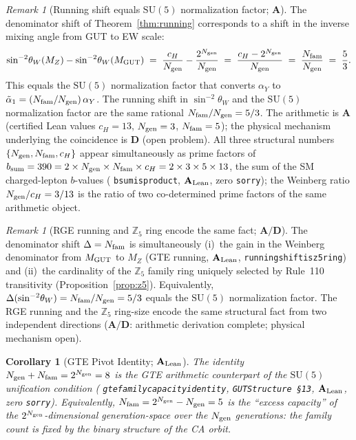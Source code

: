 \documentclass[11pt]{article}
\newtheorem{corollary}[theorem]{Corollary}
\theoremstyle{remark}
\newtheorem{remark}[theorem]{Remark}
\newcommand{\Ngen}{N_{\rm gen}}
\newcommand{\Nfam}{N_{\rm fam}}
\newcommand{\cH}{c_H}
\newcommand{\lean}[1]{%
  \penalty-100
  \begingroup\def\_{\textunderscore\allowbreak}\texttt{#1}\endgroup}
\newcommand{\CatA}{\textbf{A}}
\newcommand{\CatAL}{\ensuremath{\textbf{A}_{\rm Lean}}}
\newcommand{\CatAD}{\textbf{A/D}}
\newcommand{\CatD}{\textbf{D}}
\begin{document}
\begin{remark}[Running shift equals $\mathrm{SU}(5)$ normalization factor; $\CatA$]
\label{rem:running_shift_su5}
The denominator shift of Theorem~\ref{thm:running} corresponds to a shift in the inverse
mixing angle from GUT to EW scale:
\begin{equation}
  \sin^{-2}\!\theta_W(M_Z) - \sin^{-2}\!\theta_W(M_{\rm GUT})
  \;=\; \frac{\cH}{\Ngen} - \frac{2^{\Ngen}}{\Ngen}
  \;=\; \frac{\cH - 2^{\Ngen}}{\Ngen}
  \;=\; \frac{\Nfam}{\Ngen}
  \;=\; \frac{5}{3}.
\end{equation}
This equals the $\mathrm{SU}(5)$ normalization factor that converts $\alpha_Y$ to
$\tilde{\alpha}_1 = (\Nfam/\Ngen)\,\alpha_Y$.
The running shift in $\sin^{-2}\!\theta_W$ and the $\mathrm{SU}(5)$ normalization
factor are the same rational $\Nfam/\Ngen = 5/3$.
The arithmetic is $\CatA$ (certified Lean values $\cH = 13$, $\Ngen = 3$, $\Nfam = 5$);
the physical mechanism underlying the coincidence is $\CatD$ (open problem).
All three structural numbers $\{\Ngen, \Nfam, \cH\}$ appear simultaneously as prime factors
of $b_{\rm sum} = 390 = 2\times\Ngen\times\Nfam\times\cH = 2\times 3\times 5\times 13$,
the sum of the SM charged-lepton $b$-values (\lean{b\_sum\_is\_product}, $\CatAL$,
zero \texttt{sorry}); the Weinberg ratio $\Ngen/\cH = 3/13$ is the ratio of two
co-determined prime factors of the same arithmetic object.
\end{remark}

\begin{remark}[RGE running and $\mathbb{Z}_5$ ring encode the same fact; $\CatAD$]
\label{rem:rge_z5_identity}
The denominator shift $\Delta = \Nfam$ is simultaneously (i)~the gain in the Weinberg
denominator from $M_{\rm GUT}$ to $M_Z$ (GTE running, $\CatAL$,
\lean{running\_shift\_is\_z5\_ring}) and (ii)~the cardinality of the $\mathbb{Z}_5$ family
ring uniquely selected by Rule~110 transitivity (Proposition~\ref{prop:z5}).  Equivalently,
$\Delta(\sin^{-2}\!\theta_W) = \Nfam/\Ngen = 5/3$ equals the $\mathrm{SU}(5)$ normalization
factor.  The RGE running and the $\mathbb{Z}_5$ ring-size encode the same structural fact
from two independent directions ($\CatAD$: arithmetic derivation complete; physical
mechanism open).
\end{remark}

\begin{corollary}[GTE Pivot Identity; $\CatAL$]
\label{cor:gte_pivot}
The identity $\Ngen + \Nfam = 2^{\Ngen} = 8$ is the GTE arithmetic counterpart of
the $\mathrm{SU}(5)$ unification condition
(\lean{gte\_family\_capacity\_identity}, \texttt{GUTStructure~\S13}, $\CatAL$,
zero \texttt{sorry}).
Equivalently, $\Nfam = 2^{\Ngen} - \Ngen = 5$ is the ``excess capacity'' of the
$2^{\Ngen}$-dimensional generation-space over the $\Ngen$ generations: the family
count is fixed by the binary structure of the CA orbit.
\end{corollary}
\end{document}
